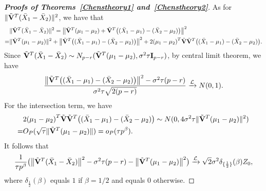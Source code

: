 \documentclass[3p]{elsarticle}
\theoremstyle{plain}
\theoremstyle{definition}
\theoremstyle{remark}
\begin{document}
\begin{appendices}
\begin{proof}[\textbf{Proofs of Theorems~\ref{Chenstheory1} and~\ref{Chenstheory2}}]
    As for $\|\tilde{\mathbf{V}}^T(\bar{X}_1-\bar{X}_2)\|^2$, we have that
        $$
        \begin{aligned}
            &\|\tilde{\mathbf{V}}^T(\bar{X}_1-\bar{X}_2)\|^2
            =\big\|\tilde{\mathbf{V}}^T(\mu_1-\mu_2)+\tilde{\mathbf{V}}^T\big((\bar{X}_1-\mu_1)-(\bar{X}_2-\mu_2)\big)\big\|^2\\
            =&\|\tilde{\mathbf{V}}^T(\mu_1-\mu_2)\|^2+
            \big\|\tilde{\mathbf{V}}^T\big((\bar{X}_1-\mu_1)-(\bar{X}_2-\mu_2)\big)\big\|^2+
            2{(\mu_1-\mu_2)}^T\tilde{\mathbf{V}}\tilde{\mathbf{V}}^T\big((\bar{X}_1-\mu_1)-(\bar{X}_2-\mu_2)\big).
        \end{aligned}
        $$
Since $\tilde{\mathbf{V}}^T (\bar{X}_1-\bar{X}_2)\sim N_{p-r}(\tilde{\mathbf{V}}^T (\mu_1-\mu_2),  \sigma^2 \tau \mathbf{I}_{p-r})$, by central limit theorem, we have
    $$
\frac{
    \big\|\tilde{\mathbf{V}}^T\big((\bar{X}_1-\mu_1)-(\bar{X}_2-\mu_2)\big)\big\|^2-\sigma^2 \tau (p-r)}{\sigma^2 \tau\sqrt{2(p-r)}}\xrightarrow{\mathcal{L}} N(0,1).
    $$
    For the intersection term, we have
    \begin{equation*}
        \begin{aligned}
            &2{(\mu_1-\mu_2)}^T\tilde{\mathbf{V}}\tilde{\mathbf{V}}^T\big((\bar{X}_1-\mu_1)-(\bar{X}_2-\mu_2)\big)
            \sim N(0,4\sigma^2 \tau \|\tilde{\mathbf{V}}^T(\mu_1-\mu_2)\|^2)\\
            =& O_P(\sqrt{\tau}\|\tilde{\mathbf{V}}^T(\mu_1-\mu_2)\| )=o_P(\tau p^{\beta}).
        \end{aligned}
    \end{equation*}
    It follows that
    \begin{equation}\label{eq:kkk3}
\frac{1}{\tau p^\beta}
    \big(\big\|\tilde{\mathbf{V}}^T(\bar{X}_1-\bar{X}_2)\big\|^2-\sigma^2 \tau (p-r)-\big\|\tilde{\mathbf{V}}^T(\mu_1-\mu_2)\big\|^2\big)
    \xrightarrow{\mathcal{L}} 
        \sqrt{2}\sigma^2 \delta_{\{\frac{1}{2}\}}(\beta)Z_0,
    \end{equation}
    where $\delta_{\frac{1}{2}}(\beta)$ equals $1$ if $\beta=1/2$ and equals $0$ otherwise.



\end{proof}
\end{appendices}
\end{document}
